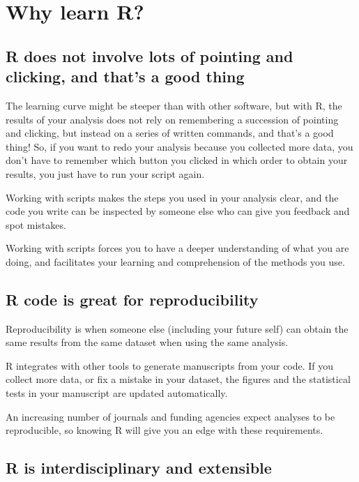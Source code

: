 \documentclass[]{book}
\theoremstyle{definition}
\theoremstyle{definition}
\theoremstyle{definition}
\theoremstyle{remark}
\begin{document}
\section{Why learn R?}\label{why-learn-r}

\subsection{R does not involve lots of pointing and clicking, and that's
a good
thing}\label{r-does-not-involve-lots-of-pointing-and-clicking-and-thats-a-good-thing}

The learning curve might be steeper than with other software, but with
R, the results of your analysis does not rely on remembering a
succession of pointing and clicking, but instead on a series of written
commands, and that's a good thing! So, if you want to redo your analysis
because you collected more data, you don't have to remember which button
you clicked in which order to obtain your results, you just have to run
your script again.

Working with scripts makes the steps you used in your analysis clear,
and the code you write can be inspected by someone else who can give you
feedback and spot mistakes.

Working with scripts forces you to have a deeper understanding of what
you are doing, and facilitates your learning and comprehension of the
methods you use.

\subsection{R code is great for
reproducibility}\label{r-code-is-great-for-reproducibility}

Reproducibility is when someone else (including your future self) can
obtain the same results from the same dataset when using the same
analysis.

R integrates with other tools to generate manuscripts from your code. If
you collect more data, or fix a mistake in your dataset, the figures and
the statistical tests in your manuscript are updated automatically.

An increasing number of journals and funding agencies expect analyses to
be reproducible, so knowing R will give you an edge with these
requirements.

\subsection{R is interdisciplinary and
extensible}\label{r-is-interdisciplinary-and-extensible}
\end{document}
